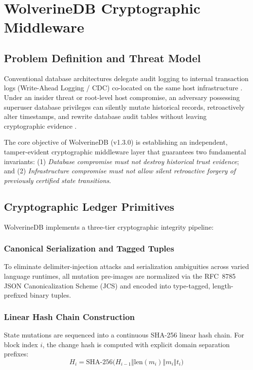 \chapter{WolverineDB Cryptographic Middleware}
\label{ch:wolverinedb}

\section{Problem Definition and Threat Model}
\label{sec:wdb_problem}

Conventional database architectures delegate audit logging to internal transaction logs (Write-Ahead Logging / CDC) co-located on the same host infrastructure \cite{kleppmann2017designing}. Under an insider threat or root-level host compromise, an adversary possessing superuser database privileges can silently mutate historical records, retroactively alter timestamps, and rewrite database audit tables without leaving cryptographic evidence \cite{shostack2014threat}. 

The core objective of WolverineDB (v1.3.0) is establishing an independent, tamper-evident cryptographic middleware layer that guarantees two fundamental invariants: (1) \textit{Database compromise must not destroy historical trust evidence}; and (2) \textit{Infrastructure compromise must not allow silent retroactive forgery of previously certified state transitions}.

\section{Cryptographic Ledger Primitives}
\label{sec:crypto_primitives}

WolverineDB implements a three-tier cryptographic integrity pipeline:

\subsection{Canonical Serialization and Tagged Tuples}
To eliminate delimiter-injection attacks and serialization ambiguities across varied language runtimes, all mutation pre-images are normalized via the RFC~8785 JSON Canonicalization Scheme (JCS) \cite{rfc8785} and encoded into type-tagged, length-prefixed binary tuples.

\subsection{Linear Hash Chain Construction}
State mutations are sequenced into a continuous SHA-256 linear hash chain. For block index $i$, the change hash is computed with explicit domain separation prefixes:
\begin{equation}
\label{eq:hash_chain}
H_i = \text{SHA-256}\big(H_{i-1} \mathbin{\Vert} \text{len}(m_i) \mathbin{\Vert} m_i \mathbin{\Vert} t_i\big)
\end{equation}

